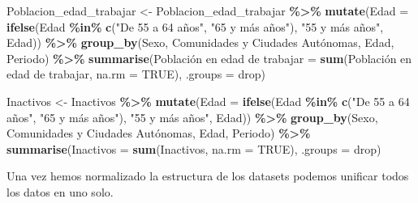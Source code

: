 \documentclass[notspecified,article,submit,moreauthors,pdftex]{Definitions/mdpi}
\newenvironment{Shaded}{\begin{snugshade}}{\end{snugshade}}
\newcommand{\AttributeTok}[1]{\textcolor[rgb]{0.13,0.29,0.53}{#1}}
\newcommand{\ConstantTok}[1]{\textcolor[rgb]{0.56,0.35,0.01}{#1}}
\newcommand{\FunctionTok}[1]{\textcolor[rgb]{0.13,0.29,0.53}{\textbf{#1}}}
\newcommand{\NormalTok}[1]{#1}
\newcommand{\OtherTok}[1]{\textcolor[rgb]{0.56,0.35,0.01}{#1}}
\newcommand{\SpecialCharTok}[1]{\textcolor[rgb]{0.81,0.36,0.00}{\textbf{#1}}}
\newcommand{\StringTok}[1]{\textcolor[rgb]{0.31,0.60,0.02}{#1}}
\begin{document}
\begin{Shaded}
\begin{Highlighting}[]
\NormalTok{Poblacion\_edad\_trabajar }\OtherTok{\textless{}{-}}\NormalTok{ Poblacion\_edad\_trabajar }\SpecialCharTok{\%\textgreater{}\%}
  \FunctionTok{mutate}\NormalTok{(}\AttributeTok{Edad =} \FunctionTok{ifelse}\NormalTok{(Edad }\SpecialCharTok{\%in\%} \FunctionTok{c}\NormalTok{(}\StringTok{"De 55 a 64 años"}\NormalTok{, }\StringTok{"65 y más años"}\NormalTok{), }
                       \StringTok{"55 y más años"}\NormalTok{, Edad)) }\SpecialCharTok{\%\textgreater{}\%}
  \FunctionTok{group\_by}\NormalTok{(Sexo, }\StringTok{\textasciigrave{}}\AttributeTok{Comunidades y Ciudades Autónomas}\StringTok{\textasciigrave{}}\NormalTok{, Edad, Periodo) }\SpecialCharTok{\%\textgreater{}\%}
  \FunctionTok{summarise}\NormalTok{(}\StringTok{\textasciigrave{}}\AttributeTok{Población en edad de trabajar}\StringTok{\textasciigrave{}} \OtherTok{=} 
              \FunctionTok{sum}\NormalTok{(}\StringTok{\textasciigrave{}}\AttributeTok{Población en edad de trabajar}\StringTok{\textasciigrave{}}\NormalTok{, }\AttributeTok{na.rm =} \ConstantTok{TRUE}\NormalTok{), }\AttributeTok{.groups =} \StringTok{\textquotesingle{}drop\textquotesingle{}}\NormalTok{)}

\NormalTok{Inactivos }\OtherTok{\textless{}{-}}\NormalTok{ Inactivos }\SpecialCharTok{\%\textgreater{}\%}
  \FunctionTok{mutate}\NormalTok{(}\AttributeTok{Edad =} \FunctionTok{ifelse}\NormalTok{(Edad }\SpecialCharTok{\%in\%} \FunctionTok{c}\NormalTok{(}\StringTok{"De 55 a 64 años"}\NormalTok{, }\StringTok{"65 y más años"}\NormalTok{), }
                       \StringTok{"55 y más años"}\NormalTok{, Edad)) }\SpecialCharTok{\%\textgreater{}\%}
  \FunctionTok{group\_by}\NormalTok{(Sexo, }\StringTok{\textasciigrave{}}\AttributeTok{Comunidades y Ciudades Autónomas}\StringTok{\textasciigrave{}}\NormalTok{, Edad, Periodo) }\SpecialCharTok{\%\textgreater{}\%}
  \FunctionTok{summarise}\NormalTok{(}\StringTok{\textasciigrave{}}\AttributeTok{Inactivos}\StringTok{\textasciigrave{}} \OtherTok{=} \FunctionTok{sum}\NormalTok{(}\StringTok{\textasciigrave{}}\AttributeTok{Inactivos}\StringTok{\textasciigrave{}}\NormalTok{, }\AttributeTok{na.rm =} \ConstantTok{TRUE}\NormalTok{), }\AttributeTok{.groups =} \StringTok{\textquotesingle{}drop\textquotesingle{}}\NormalTok{)}
\end{Highlighting}
\end{Shaded}

Una vez hemos normalizado la estructura de los datasets podemos unificar
todos los datos en uno solo.
\end{document}

